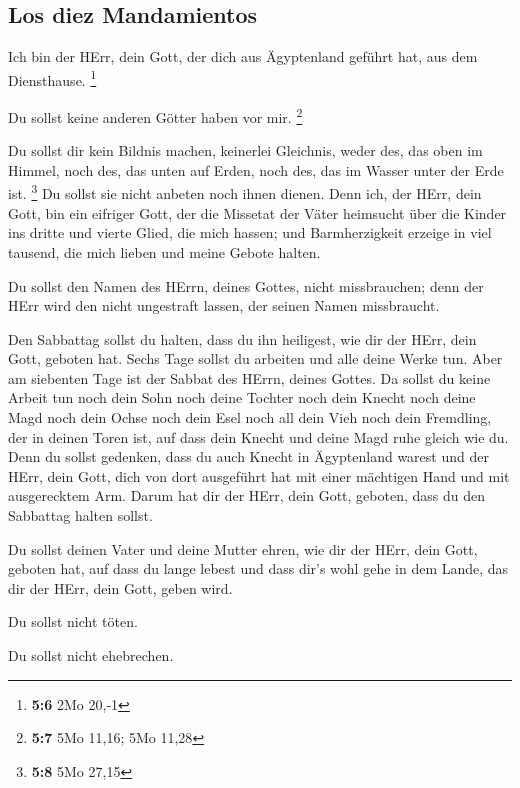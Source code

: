 \hypertarget{los-diez-mandamientos}{%
\subsection{Los diez Mandamientos}\label{los-diez-mandamientos}}

 Ich bin der HErr, dein Gott, der dich aus Ägyptenland
geführt hat, aus dem Diensthause. \footnote{\textbf{5:6} 2Mo 20,-1}

 Du sollst keine anderen Götter haben vor mir. \footnote{\textbf{5:7}
  5Mo 11,16; 5Mo 11,28}

 Du sollst dir kein Bildnis machen, keinerlei Gleichnis,
weder des, das oben im Himmel, noch des, das unten auf Erden, noch des,
das im Wasser unter der Erde ist. \footnote{\textbf{5:8} 5Mo 27,15}
 Du sollst sie nicht anbeten noch ihnen dienen. Denn ich,
der HErr, dein Gott, bin ein eifriger Gott, der die Missetat der Väter
heimsucht über die Kinder ins dritte und vierte Glied, die mich hassen;
 und Barmherzigkeit erzeige in viel tausend, die mich
lieben und meine Gebote halten.

 Du sollst den Namen des HErrn, deines Gottes, nicht
missbrauchen; denn der HErr wird den nicht ungestraft lassen, der seinen
Namen missbraucht.

 Den Sabbattag sollst du halten, dass du ihn heiligest,
wie dir der HErr, dein Gott, geboten hat.  Sechs Tage
sollst du arbeiten und alle deine Werke tun.  Aber am
siebenten Tage ist der Sabbat des HErrn, deines Gottes. Da sollst du
keine Arbeit tun noch dein Sohn noch deine Tochter noch dein Knecht noch
deine Magd noch dein Ochse noch dein Esel noch all dein Vieh noch dein
Fremdling, der in deinen Toren ist, auf dass dein Knecht und deine Magd
ruhe gleich wie du.  Denn du sollst gedenken, dass du
auch Knecht in Ägyptenland warest und der HErr, dein Gott, dich von dort
ausgeführt hat mit einer mächtigen Hand und mit ausgerecktem Arm. Darum
hat dir der HErr, dein Gott, geboten, dass du den Sabbattag halten
sollst.

 Du sollst deinen Vater und deine Mutter ehren, wie dir
der HErr, dein Gott, geboten hat, auf dass du lange lebest und dass
dir's wohl gehe in dem Lande, das dir der HErr, dein Gott, geben wird.

 Du sollst nicht töten.

 Du sollst nicht ehebrechen.

